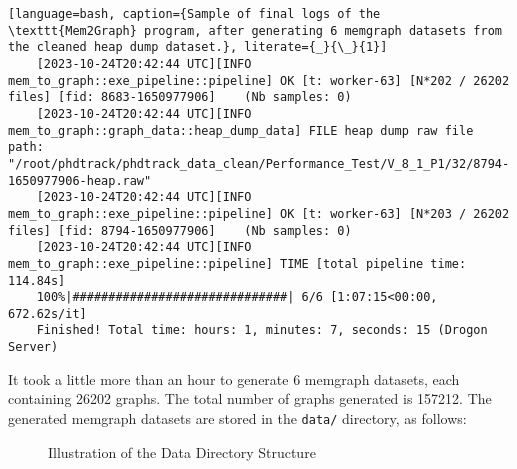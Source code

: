 \begin{lstlisting}[language=bash, caption={Sample of final logs of the \texttt{Mem2Graph} program, after generating 6 memgraph datasets from the cleaned heap dump dataset.}, literate={_}{\_}{1}]
    [2023-10-24T20:42:44 UTC][INFO mem_to_graph::exe_pipeline::pipeline] OK [t: worker-63] [N*202 / 26202 files] [fid: 8683-1650977906]    (Nb samples: 0)
    [2023-10-24T20:42:44 UTC][INFO mem_to_graph::graph_data::heap_dump_data] FILE heap dump raw file path: "/root/phdtrack/phdtrack_data_clean/Performance_Test/V_8_1_P1/32/8794-1650977906-heap.raw"
    [2023-10-24T20:42:44 UTC][INFO mem_to_graph::exe_pipeline::pipeline] OK [t: worker-63] [N*203 / 26202 files] [fid: 8794-1650977906]    (Nb samples: 0)
    [2023-10-24T20:42:44 UTC][INFO mem_to_graph::exe_pipeline::pipeline] TIME [total pipeline time: 114.84s]
    100%|##############################| 6/6 [1:07:15<00:00, 672.62s/it]
    Finished! Total time: hours: 1, minutes: 7, seconds: 15 (Drogon Server)
\end{lstlisting}

It took a little more than an hour to generate 6 memgraph datasets, each containing 26202 graphs. The total number of graphs generated is 157212. The generated memgraph datasets are stored in the \texttt{data/} directory, as follows:

\begin{figure}[H]
    \centering
    \caption{Illustration of the Data Directory Structure}
    \label{fig:data_structure}
    \begin{minipage}{0.8\textwidth}
    \end{minipage}
\end{figure}

